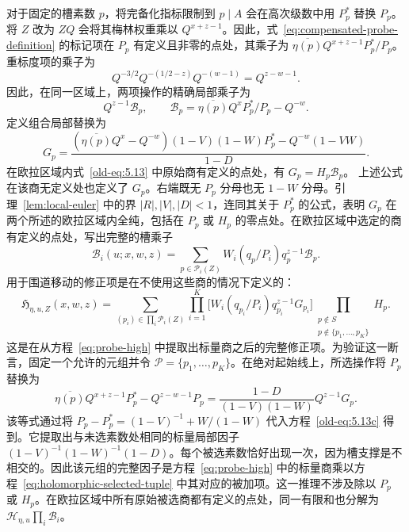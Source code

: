 \documentclass[11pt,a4paper]{article}
\numberwithin{equation}{section}
\numberwithin{figure}{section}
\theoremstyle{definition}
\theoremstyle{remark}
\begin{document}
对于固定的槽素数 $p$，将完备化指标限制到
$p\mid A$ 会在高次级数中用 $P_p^*$ 替换 $P_p$。将
$Z$ 改为 $ZQ$ 会将其梅林权重乘以 $Q^{x+z-1}$。因此，式~\eqref{eq:compensated-probe-definition}
的标记项在 $P_p$ 有定义且非零的点处，其乘子为
$\overline{\eta(p)}Q^{x+z-1}P_p^*/P_p$。重标度项的乘子为
\[
 Q^{-3/2}Q^{-(1/2-z)}Q^{-(w-1)}=Q^{z-w-1}.
\]
因此，在同一区域上，两项操作的精确局部乘子为
\begin{equation}\label{old-eq:5.13}
 Q^{z-1}\mathcal B_p,\qquad
 \mathcal B_p=\overline{\eta(p)}Q^xP_p^*/P_p-Q^{-w}.
\end{equation}
定义组合局部替换为
\begin{equation}\label{old-eq:5.13c}
 G_p=
 \frac{(\overline{\eta(p)}Q^x-Q^{-w})(1-V)(1-W)P_p^*
       -Q^{-w}(1-VW)}{1-D}.
\end{equation}
在欧拉区域内式~\eqref{old-eq:5.13} 中原始商有定义的点处，有 $G_p=H_p\mathcal B_p$。
上述公式在该商无定义处也定义了
$G_p$。右端既无 $P_p$ 分母也无 $1-W$ 分母。引理~\ref{lem:local-euler} 中的界 $|R|,|V|,|D|<1$，连同其关于 $P_p^*$ 的公式，表明 $G_p$ 在两个所述的欧拉区域内全纯，包括在 $P_p$ 或 $H_p$ 的零点处。在欧拉区域中选定的商有定义的点处，写出完整的槽乘子
\[
 \mathcal B_i(u;x,w,z)=\sum_{p\in\mathcal P_i(Z)}
           W_i(q_p/P_i)q_p^{z-1}\mathcal B_p.
\]
用于围道移动的修正项是在不使用这些商的情况下定义的：
\begin{equation}\label{eq:holomorphic-selected-tuple}
 \mathfrak H_{\eta,u,Z}(x,w,z)=
 \sum_{(p_i)\in\prod_i\mathcal P_i(Z)}
 \prod_{i=1}^K\bigl[W_i(q_{p_i}/P_i)q_{p_i}^{z-1}G_{p_i}\bigr]
 \prod_{\substack{p\notin S\\p\notin\{p_1,\ldots,p_K\}}}H_p.
\end{equation}
这是在从方程~\eqref{eq:probe-high} 中提取出标量商之后的完整修正项。为验证这一断言，固定一个允许的元组并令 $\mathcal P=\{p_1,\ldots,p_K\}$。在绝对起始线上，所选操作将 $P_p$ 替换为
\begin{equation}\label{eq:selected-local-operation}
 \overline{\eta(p)}Q^{x+z-1}P_p^*-Q^{z-w-1}P_p
 =\frac{1-D}{(1-V)(1-W)}Q^{z-1}G_p.
\end{equation}
该等式通过将 $P_p-P_p^*=(1-V)^{-1}+W/(1-W)$ 代入方程~\eqref{old-eq:5.13c} 得到。它提取出与未选素数处相同的标量局部因子 $(1-V)^{-1}(1-W)^{-1}(1-D)$。每个被选素数恰好出现一次，因为槽支撑是不相交的。因此该元组的完整因子是方程~\eqref{eq:probe-high} 中的标量商乘以方程~\eqref{eq:holomorphic-selected-tuple} 中其对应的被加项。这一推理不涉及除以 $P_p$ 或 $H_p$。在欧拉区域中所有原始被选商都有定义的点处，同一有限和也分解为 $\mathcal H_{\eta,u}\prod_i\mathcal B_i$。
\end{document}
